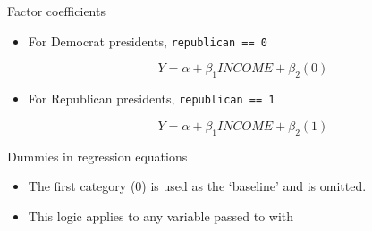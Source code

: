 \documentclass[t]{beamer}
\begin{document}
	\begin{frame}[c]{Factor coefficients}
	
		\begin{block}{}
			
			\begin{itemize}
				\item For Democrat presidents, \texttt{republican == 0}
				
				$$Y = \alpha + \beta_1 INCOME + \beta_2 (0)$$
				
				\item For Republican presidents, \texttt{republican == 1}
				
				$$Y = \alpha + \beta_1 INCOME + \beta_2 (1)$$
				
			\end{itemize}
						
		\end{block}
		
		\begin{block}{Dummies in regression equations}
			
			\begin{itemize}
			
				\item The first category (0) is used as the `baseline' and is omitted.
				\item This logic applies to any variable passed to  with 

			\end{itemize}
			
		\end{block}
	
	\end{frame}
	
\end{document}
